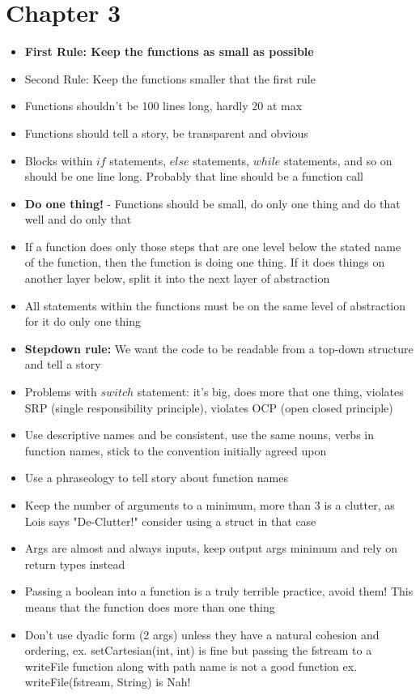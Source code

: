 \documentclass[14pt]{article}
\begin{document}
\section*{Chapter 3}
\begin{itemize}

	\item \textbf{First Rule: Keep the functions as small as possible}
	\item Second Rule: Keep the functions smaller that the first rule
	\item Functions shouldn't be 100 lines long, hardly 20 at max
	\item Functions should tell a story, be transparent and obvious
	\item Blocks within $if$ statements, $else$ statements, $while$ statements, and so on should be one line long. Probably that line should be a function call
	\item \textbf{Do one thing!} - Functions should be small, do only one thing and do that well and do only that
	\item If a function does only those steps that are one level below the stated name of the function, then the function is doing one thing. If it does things on another layer below, split it into the next layer of abstraction
	\item All statements within the functions must be on the same level of abstraction for it do only one thing
	\item \textbf{Stepdown rule:} We want the code to be readable from a top-down structure and tell a story
	\item Problems with $switch$ statement: it's big, does more that one thing, violates SRP (single responsibility principle), violates OCP (open closed principle)
	\item Use descriptive names and be consistent, use the same nouns, verbs in function names, stick to the convention initially agreed upon
	\item Use a phraseology to tell story about function names
	\item Keep the number of arguments to a minimum, more than 3 is a clutter, as Lois says "De-Clutter!" consider using a struct in that case
	\item Args are almost and always inputs, keep output args minimum and rely on return types instead
	\item Passing a boolean into a function is a truly terrible practice, avoid them! This means that the function does more than one thing
	\item Don't use dyadic form (2 args) unless they have a natural cohesion and ordering, ex. setCartesian(int, int) is fine but passing the fstream to a writeFile function along with path name is not a good function ex. writeFile(fstream, String) is Nah!

\end{itemize}
\end{document}

